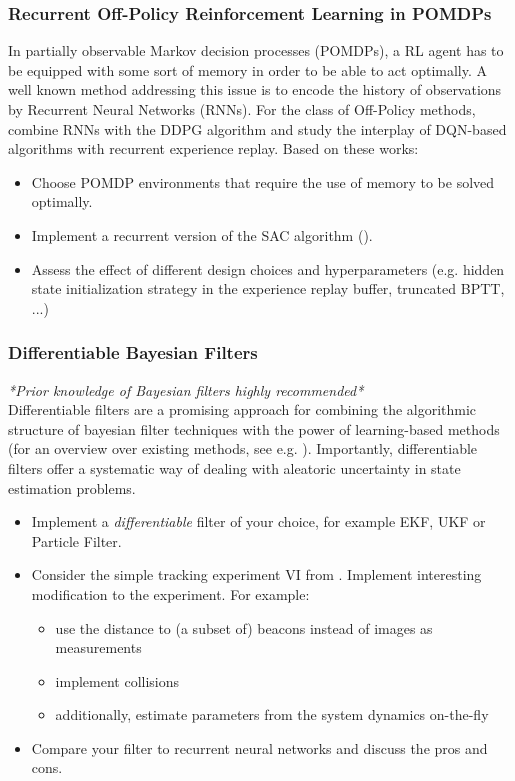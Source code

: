 \documentclass[a4paper]{article}
\begin{document}
\subsubsection{Recurrent Off-Policy Reinforcement Learning in POMDPs}
In partially observable Markov decision processes (POMDPs), a RL agent has to be equipped with some sort of memory in order to be able to act optimally. A well known method addressing this issue is to encode the history of observations by Recurrent Neural Networks (RNNs).
For the class of Off-Policy methods, \cite{heess2015memory} combine RNNs with the DDPG algorithm and \cite{kapturowski2018recurrent} study the interplay of DQN-based algorithms with recurrent experience replay.
Based on these works:
\begin{itemize}
  \item Choose POMDP environments that require the use of memory to be solved optimally.
  \item Implement a recurrent version of the SAC algorithm (\cite{Haarnoja2018a}).
  \item Assess the effect of different design choices and hyperparameters (e.g. hidden state initialization strategy in the experience replay buffer, truncated BPTT, ...)
\end{itemize}

\subsubsection{Differentiable Bayesian Filters}
\textit{*Prior knowledge of Bayesian filters highly recommended*}\\
Differentiable filters are a promising approach for combining the algorithmic structure of bayesian filter techniques with the power of learning-based methods (for an overview over existing methods, see e.g. \cite{kloss2021train}). Importantly, differentiable filters offer a systematic way of dealing with aleatoric uncertainty in state estimation problems.
\begin{itemize}
  \item Implement a \textit{differentiable} filter of your choice, for example EKF, UKF or Particle Filter.
  \item Consider the simple tracking experiment VI from \cite{kloss2021train}. Implement interesting modification to the experiment. For example:
        \begin{itemize}
          \item use the distance to (a subset of) beacons instead of images as measurements
          \item implement collisions
          \item additionally, estimate parameters from the system dynamics on-the-fly
        \end{itemize}
  \item Compare your filter to recurrent neural networks and discuss the pros and cons.
\end{itemize}
\end{document}
